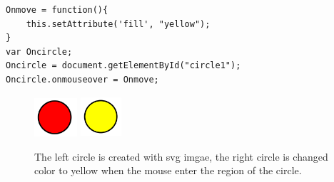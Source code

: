 \documentclass[11pt,twoside]{report}
\begin{document}
\begin{lstlisting}
Onmove = function(){
    this.setAttribute('fill', "yellow");
}
var Oncircle;
Oncircle = document.getElementById("circle1");
Oncircle.onmouseover = Onmove;
\end{lstlisting}

\begin{figure}[h]
	\begin{center}
		\includegraphics[height = 1.45cm, width = 1.6cm]{figure/svg/svgdemo0.PNG}
		\hspace{4cm}
		\includegraphics[height = 1.5cm, width = 1.5cm]{figure/svg/svgdemo1.PNG}
		\caption{The left circle is created with svg imgae, the right circle is changed color to yellow when the mouse enter the region of the circle. }
		\label{Example_6.3.0}
	\end{center}
\end{figure}

\newpage
\end{document}
